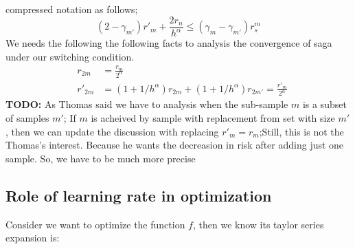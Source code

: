 \documentclass[11pt, a4paper, reqno, twoside]{scrartcl}
\theoremstyle{style}
\newcommand{\0}{\mathbf{0}} %
\newcommand{\todo}[1]{\marginpar[\hspace*{4.5em}\textbf{TODO}\hspace*{-4.5em}]{\textbf{TODO}}\textbf{TODO:} #1}
\begin{document}
	compressed notation as follows; 
\begin{equation}
	(2-\gamma_{m'})r'_m + \frac{2 r_n}{ h^\alpha} \leq (\gamma_m - \gamma_{m'}) r_s^m 
	\label{eqn:tradeoff_loss}
\end{equation}
We needs the following the following facts to analysis the convergence of saga
under our switching condition. 
\begin{eqnarray*}
	& r_{2m} & = \frac{r_{m}}{2^{\alpha}} \\ 
	& r'_{2m} & = (1+1/h^\alpha)r_{2m} + (1+1/h^\alpha)
	r_{2m'}  = \frac{r'_{m}}{2^{\alpha}}
\end{eqnarray*}
\todo{As Thomas said we have to analysis when the sub-sample $m$ is a subset of
samples $m'$; If $m$ is acheived by sample with replacement from set with size
$m'$, then we can update the discussion with replacing $r'_m = r_m$;Still, this
is not the Thomas's interest. Because he wants the decreasion in risk after
adding just one sample. So, we have to be much more precise}

\subsection*{Role of learning rate in optimization} 
Consider we want to optimize the function $f$, then we know its taylor series
expansion is: 
\end{document}
